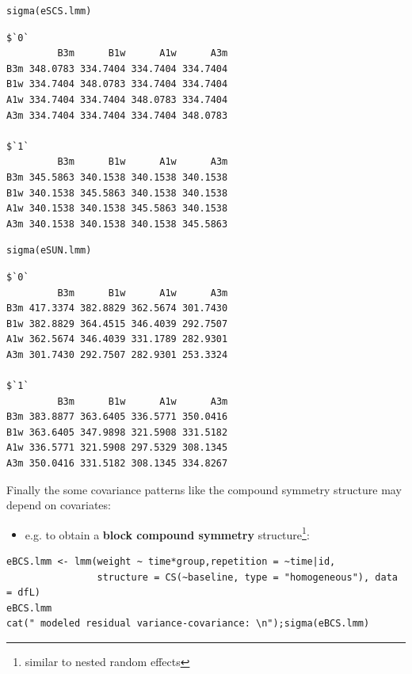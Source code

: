 \documentclass[12pt]{article}
\begin{document}
\begin{minipage}{0.47\linewidth}
\lstset{language=r,label= ,caption= ,captionpos=b,numbers=none}
\begin{lstlisting}
sigma(eSCS.lmm)
\end{lstlisting}

\begin{verbatim}
$`0`
         B3m      B1w      A1w      A3m
B3m 348.0783 334.7404 334.7404 334.7404
B1w 334.7404 348.0783 334.7404 334.7404
A1w 334.7404 334.7404 348.0783 334.7404
A3m 334.7404 334.7404 334.7404 348.0783

$`1`
         B3m      B1w      A1w      A3m
B3m 345.5863 340.1538 340.1538 340.1538
B1w 340.1538 345.5863 340.1538 340.1538
A1w 340.1538 340.1538 345.5863 340.1538
A3m 340.1538 340.1538 340.1538 345.5863
\end{verbatim}
\end{minipage}
\begin{minipage}{0.47\linewidth}
\lstset{language=r,label= ,caption= ,captionpos=b,numbers=none}
\begin{lstlisting}
sigma(eSUN.lmm)
\end{lstlisting}

\begin{verbatim}
$`0`
         B3m      B1w      A1w      A3m
B3m 417.3374 382.8829 362.5674 301.7430
B1w 382.8829 364.4515 346.4039 292.7507
A1w 362.5674 346.4039 331.1789 282.9301
A3m 301.7430 292.7507 282.9301 253.3324

$`1`
         B3m      B1w      A1w      A3m
B3m 383.8877 363.6405 336.5771 350.0416
B1w 363.6405 347.9898 321.5908 331.5182
A1w 336.5771 321.5908 297.5329 308.1345
A3m 350.0416 331.5182 308.1345 334.8267
\end{verbatim}
\end{minipage}

\clearpage

\noindent Finally the some covariance patterns like the compound
symmetry structure may depend on covariates:
\begin{itemize}
\item e.g. to obtain a \textbf{block compound symmetry} structure\footnote{similar to
nested random effects}:
\end{itemize}
\lstset{language=r,label= ,caption= ,captionpos=b,numbers=none}
\begin{lstlisting}
eBCS.lmm <- lmm(weight ~ time*group,repetition = ~time|id,
                structure = CS(~baseline, type = "homogeneous"), data = dfL)
eBCS.lmm
cat(" modeled residual variance-covariance: \n");sigma(eBCS.lmm)
\end{lstlisting}
\end{document}
